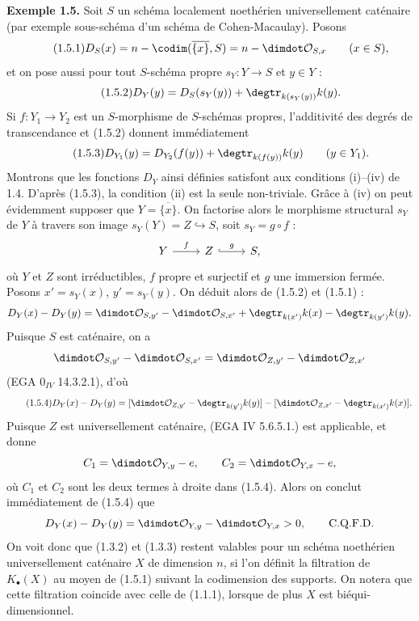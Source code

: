 \textbf{Exemple 1.5.} Soit $S$ un schéma localement noethérien universellement caténaire (par exemple sous-schéma d'un schéma de Cohen-Macaulay). Posons
\begin{equation}\tag{1.5.1}
D_S(x)=n-\codim(\overline{\{x\}},S)=n-\dimdot\mathcal O_{S,x}\qquad(x\in S),
\end{equation}
et on pose aussi pour tout $S$-schéma propre $s_Y:Y\to S$ et $y\in Y$ :
\begin{equation}\tag{1.5.2}
D_Y(y)=D_S(s_Y(y))+\degtr_{k(s_Y(y))}k(y).
\end{equation}
Si $f:Y_1\to Y_2$ est un $S$-morphisme de $S$-schémas propres, l'additivité des degrés de transcendance et (1.5.2) donnent immédiatement
\begin{equation}\tag{1.5.3}
D_{Y_1}(y)=D_{Y_2}(f(y))+\degtr_{k(f(y))}k(y)\qquad(y\in Y_1).
\end{equation}
Montrons que les fonctions $D_Y$ ainsi définies satisfont aux conditions (i)--(iv) de 1.4. D'après (1.5.3), la condition (ii) est la seule non-triviale. Grâce à (iv) on peut évidemment supposer que $Y=\overline{\{x\}}$. On factorise alors le morphisme structural $s_Y$ de $Y$ à travers son image $s_Y(Y)=Z\hookrightarrow S$, soit $s_Y=g\circ f$ :
\[
\begin{tikzcd}
Y \arrow[r,"f"] & Z \arrow[r,hook,"g"] & S,
\end{tikzcd}
\]
où $Y$ et $Z$ sont irréductibles, $f$ propre et surjectif et $g$ une immersion fermée. Posons $x'=s_Y(x)$, $y'=s_Y(y)$. On déduit alors de (1.5.2) et (1.5.1) :
\[
D_Y(x)-D_Y(y)=\dimdot\mathcal O_{S,y'}-\dimdot\mathcal O_{S,x'}+\degtr_{k(x')}k(x)-\degtr_{k(y')}k(y).
\]
Puisque $S$ est caténaire, on a
\[
\dimdot\mathcal O_{S,y'}-\dimdot\mathcal O_{S,x'}=\dimdot\mathcal O_{Z,y'}-\dimdot\mathcal O_{Z,x'}
\]
(EGA $0_{IV}$ 14.3.2.1), d'où
\begin{equation}\tag{1.5.4}
D_Y(x)-D_Y(y)=
[\dimdot\mathcal O_{Z,y'}-\degtr_{k(y')}k(y)]-[\dimdot\mathcal O_{Z,x'}-\degtr_{k(x')}k(x)].
\end{equation}
Puisque $Z$ est universellement caténaire, (EGA IV 5.6.5.1.) est applicable, et donne
\[
C_1=\dimdot\mathcal O_{Y,y}-e,\qquad C_2=\dimdot\mathcal O_{Y,x}-e,
\]
où $C_1$ et $C_2$ sont les deux termes à droite dans (1.5.4). Alors on conclut immédiatement de (1.5.4) que
\[
D_Y(x)-D_Y(y)=\dimdot\mathcal O_{Y,y}-\dimdot\mathcal O_{Y,x}>0,\qquad \text{C.Q.F.D.}
\]
On voit donc que (1.3.2) et (1.3.3) restent valables pour un schéma noethérien universellement caténaire $X$ de dimension $n$, si l'on définit la filtration de $K_\bullet(X)$ au moyen de (1.5.1) suivant la codimension des supports. On notera que cette filtration coincide avec celle de (1.1.1), lorsque de plus $X$ est biéqui-dimensionnel.

